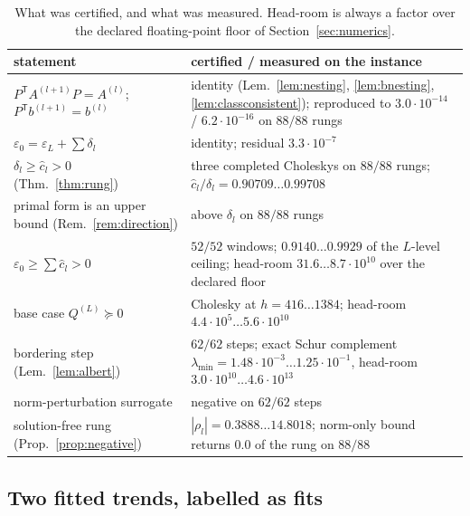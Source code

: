 \documentclass[11pt,a4paper]{article}
\theoremstyle{plain}
\theoremstyle{definition}
\newcommand{\T}{\mathsf{T}}
\newcommand{\lmin}{\lambda_{\min}}
\newcommand{\PSD}{\succeq 0}
\begin{document}
\begin{table}[t]
\centering
\small
\begin{tabularx}{\textwidth}{@{}lY@{}}
\toprule
statement & certified / measured on the instance \\
\midrule
$P^{\T}A^{(l+1)}P=A^{(l)}$; $P^{\T}b^{(l+1)}=b^{(l)}$
  & identity (Lem.~\ref{lem:nesting}, \ref{lem:bnesting}, \ref{lem:classconsistent});
    reproduced to $3.0\cdot10^{-14}$ / $6.2\cdot10^{-16}$ on $88/88$ rungs \\
$\varepsilon_{0}=\varepsilon_{L}+\sum\delta_{l}$
  & identity; residual $3.3\cdot10^{-7}$ \\
$\delta_{l}\ge\widehat c_{l}>0$ (Thm.~\ref{thm:rung})
  & three completed Choleskys on $88/88$ rungs;
    $\widehat c_{l}/\delta_{l}=0.90709\dots0.99708$ \\
primal form is an upper bound (Rem.~\ref{rem:direction})
  & above $\delta_{l}$ on $88/88$ rungs \\
$\varepsilon_{0}\ge\sum\widehat c_{l}>0$
  & $52/52$ windows; $0.9140\dots0.9929$ of the $L$-level ceiling; head-room
    $31.6\dots8.7\cdot10^{10}$ over the declared floor \\
base case $Q^{(L)}\PSD$
  & Cholesky at $h=416\dots1384$; head-room
    $4.4\cdot10^{5}\dots5.6\cdot10^{10}$ \\
bordering step (Lem.~\ref{lem:albert})
  & $62/62$ steps; exact Schur complement
    $\lmin=1.48\cdot10^{-3}\dots1.25\cdot10^{-1}$, head-room
    $3.0\cdot10^{10}\dots4.6\cdot10^{13}$ \\
norm-perturbation surrogate
  & negative on $62/62$ steps \\
solution-free rung (Prop.~\ref{prop:negative})
  & $|\rho_{l}|=0.3888\dots14.8018$; norm-only bound returns $0.0$ of the rung on
    $88/88$ \\
\bottomrule
\end{tabularx}
\caption{What was certified, and what was measured. Head-room is always a factor over
the declared floating-point floor of Section~\ref{sec:numerics}.}
\label{tab:results}
\end{table}

\subsection{Two fitted trends, labelled as fits}
\end{document}
